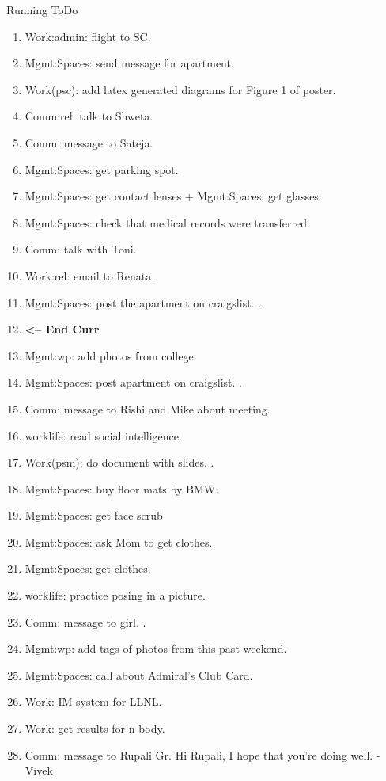 \begin{columns}
\begin{column}{0.6\linewidth}
\begin{block}{Running ToDo}
\begin{enumerate}
    \item \tiny Work:admin: flight to SC. 
    \item \tiny Mgmt:Spaces: send message for apartment. 
      
    \item \tiny Work(psc): add latex generated diagrams for Figure 1
      of poster. 

    \item \tiny Comm:rel: talk to Shweta. 
    \item \tiny Comm: message to Sateja. 

    \item \tiny Mgmt:Spaces: get parking spot. 
    \item \tiny Mgmt:Spaces: get contact lenses + Mgmt:Spaces: get glasses.

    \item \tiny Mgmt:Spaces: check that medical records were
      transferred. 

    \item \tiny Comm: talk with Toni. 
    \item \tiny Work:rel: email to Renata.  
    \item \tiny Mgmt:Spaces: post the apartment on craigslist. 
      . 

  \item \tiny \textbf{ <-- End Curr }
  \item \tiny Mgmt:wp: add photos from college.           
  \item \tiny Mgmt:Spaces: post apartment on craigslist. .
  \item \tiny Comm: message to Rishi and Mike about meeting. 
  \item \tiny worklife: read social intelligence.  
  \item \tiny Work(psm): do document with slides. .
  \item \tiny Mgmt:Spaces: buy floor mats by BMW. 
  \item \tiny Mgmt:Spaces: get face scrub
  \item \tiny Mgmt:Spaces: ask Mom to get clothes.
  \item \tiny Mgmt:Spaces: get clothes. 
  \item \tiny worklife: practice posing in a picture.  
  \item \tiny Comm: message to girl.  . 
  \item \tiny Mgmt:wp: add tags of photos from this past weekend.  
  \item \tiny Mgmt:Spaces: call about Admiral's Club Card.
  \item \tiny Work: IM system for LLNL. 
  \item \tiny Work: get results for n-body. 
    \item \tiny Comm: message to Rupali Gr. 
      Hi Rupali, I hope that you're doing well. -Vivek
      

\end{enumerate}
\end{block}
\end{column}
\end{columns}
